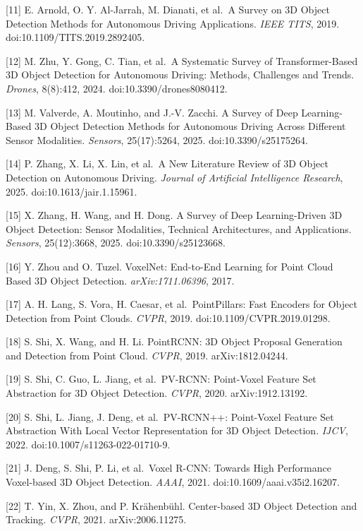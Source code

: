 {[}11{]} E. Arnold, O. Y. Al-Jarrah, M. Dianati, et al.~A Survey on 3D Object Detection Methods for Autonomous Driving Applications. \emph{IEEE TITS}, 2019. doi:10.1109/TITS.2019.2892405.

{[}12{]} M. Zhu, Y. Gong, C. Tian, et al.~A Systematic Survey of Transformer-Based 3D Object Detection for Autonomous Driving: Methods, Challenges and Trends. \emph{Drones}, 8(8):412, 2024. doi:10.3390/drones8080412.

{[}13{]} M. Valverde, A. Moutinho, and J.-V. Zacchi. A Survey of Deep Learning-Based 3D Object Detection Methods for Autonomous Driving Across Different Sensor Modalities. \emph{Sensors}, 25(17):5264, 2025. doi:10.3390/s25175264.

{[}14{]} P. Zhang, X. Li, X. Lin, et al.~A New Literature Review of 3D Object Detection on Autonomous Driving. \emph{Journal of Artificial Intelligence Research}, 2025. doi:10.1613/jair.1.15961.

{[}15{]} X. Zhang, H. Wang, and H. Dong. A Survey of Deep Learning-Driven 3D Object Detection: Sensor Modalities, Technical Architectures, and Applications. \emph{Sensors}, 25(12):3668, 2025. doi:10.3390/s25123668.

{[}16{]} Y. Zhou and O. Tuzel. VoxelNet: End-to-End Learning for Point Cloud Based 3D Object Detection. \emph{arXiv:1711.06396}, 2017.

{[}17{]} A. H. Lang, S. Vora, H. Caesar, et al.~PointPillars: Fast Encoders for Object Detection from Point Clouds. \emph{CVPR}, 2019. doi:10.1109/CVPR.2019.01298.

{[}18{]} S. Shi, X. Wang, and H. Li. PointRCNN: 3D Object Proposal Generation and Detection from Point Cloud. \emph{CVPR}, 2019. arXiv:1812.04244.

{[}19{]} S. Shi, C. Guo, L. Jiang, et al.~PV-RCNN: Point-Voxel Feature Set Abstraction for 3D Object Detection. \emph{CVPR}, 2020. arXiv:1912.13192.

{[}20{]} S. Shi, L. Jiang, J. Deng, et al.~PV-RCNN++: Point-Voxel Feature Set Abstraction With Local Vector Representation for 3D Object Detection. \emph{IJCV}, 2022. doi:10.1007/s11263-022-01710-9.

{[}21{]} J. Deng, S. Shi, P. Li, et al.~Voxel R-CNN: Towards High Performance Voxel-based 3D Object Detection. \emph{AAAI}, 2021. doi:10.1609/aaai.v35i2.16207.

{[}22{]} T. Yin, X. Zhou, and P. Krähenbühl. Center-based 3D Object Detection and Tracking. \emph{CVPR}, 2021. arXiv:2006.11275.

